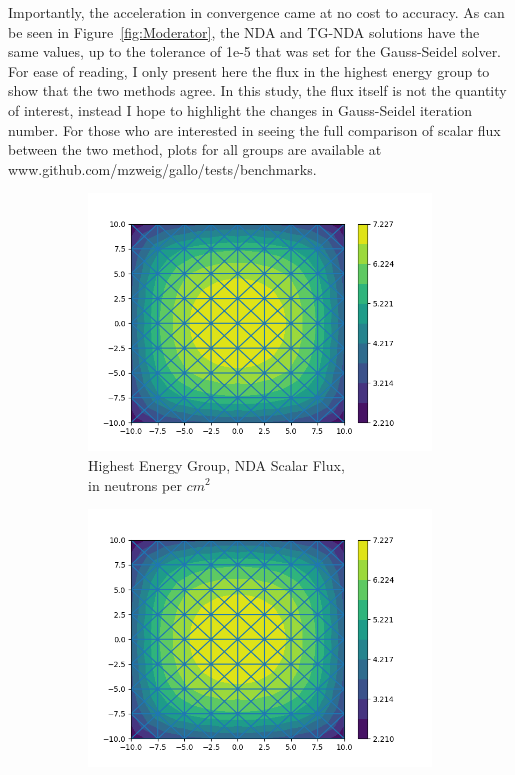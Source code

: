 Importantly, the acceleration in convergence came at no cost to accuracy. As can be seen in Figure~\ref{fig:Moderator}, the NDA and TG-NDA solutions have the same values, up to the tolerance of 1e-5 that was set for the Gauss-Seidel solver. For ease of reading, I only present here the flux in the highest energy group to show that the two methods agree.  In this study, the flux itself is not the quantity of interest, instead I hope to highlight the changes in Gauss-Seidel iteration number. For those who are interested in seeing the full comparison of scalar flux between the two method, plots for all groups are available at www.github.com/mzweig/gallo/tests/benchmarks. 
\begin{figure}[H]
\centering
\begin{subfigure}{.5\textwidth}
  \centering
  \includegraphics[width=\linewidth]{fig/nda_c5g7mod_scalar_flux_group0.png}
  \caption{Highest Energy Group, NDA Scalar Flux, \\ in neutrons per $cm^2$}
  \label{fig:NDA-mod}
\end{subfigure}%
\begin{subfigure}{.5\textwidth}
  \centering
  \includegraphics[width=\linewidth]{fig/tgnda_c5g7mod_scalar_flux_group0.png}

\end{subfigure}
\end{figure}
